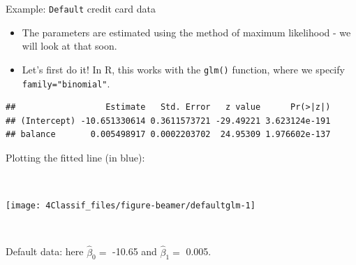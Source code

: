 \documentclass[
  10pt,
  ignorenonframetext,
]{beamer}
\newenvironment{Shaded}{\begin{snugshade}}{\end{snugshade}}
\newcommand{\AttributeTok}[1]{\textcolor[rgb]{0.13,0.29,0.53}{#1}}
\newcommand{\DecValTok}[1]{\textcolor[rgb]{0.00,0.00,0.81}{#1}}
\newcommand{\FunctionTok}[1]{\textcolor[rgb]{0.13,0.29,0.53}{\textbf{#1}}}
\newcommand{\NormalTok}[1]{#1}
\newcommand{\OtherTok}[1]{\textcolor[rgb]{0.56,0.35,0.01}{#1}}
\newcommand{\SpecialCharTok}[1]{\textcolor[rgb]{0.81,0.36,0.00}{\textbf{#1}}}
\newcommand{\StringTok}[1]{\textcolor[rgb]{0.31,0.60,0.02}{#1}}
\providecommand{\tightlist}{%
  \setlength{\itemsep}{0pt}\setlength{\parskip}{0pt}}
\begin{document}
\begin{frame}[fragile]
\begin{block}{Example: \texttt{Default} credit card data}
\protect\hypertarget{example-default-credit-card-data}{}
\(~\)

\begin{itemize}
\tightlist
\item
  The parameters are estimated using the method of maximum likelihood -
  we will look at that soon.
\end{itemize}

\vspace{2mm}

\begin{itemize}
\tightlist
\item
  Let's first do it! In R, this works with the \texttt{glm()} function,
  where we specify \texttt{family="binomial"}.
\end{itemize}

\vspace{4mm}

\scriptsize

\begin{Shaded}
\end{Shaded}

\begin{verbatim}
##                  Estimate   Std. Error   z value      Pr(>|z|)
## (Intercept) -10.651330614 0.3611573721 -29.49221 3.623124e-191
## balance       0.005498917 0.0002203702  24.95309 1.976602e-137
\end{verbatim}
\end{block}
\end{frame}

\begin{frame}
Plotting the fitted line (in blue):

\(~\)

\begin{center}\texttt{[image: 4Classif\_files/figure-beamer/defaultglm-1]} \end{center}

\(~\)

Default data: here \(\hat{\beta}_0=\) -10.65 and \(\hat{\beta}_1=\)
0.005.
\end{frame}
\end{document}
